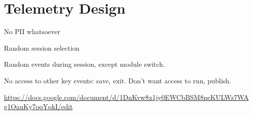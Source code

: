 \documentclass[
  acmsmall,
  review,
  anonymous,
]{acmart}
\begin{document}
\begin{table}
\begin{tabular}{ll}
  \end{tabular}
\end{table}

\section{Telemetry Design}

No PII whatsoever

Random session selection

Random events during session, except module switch.

No access to other key events: save, exit.
Don't want access to run, publish.

\url{https://docs.google.com/document/d/1DnKvw8x1jy0EWCbBSM8neKULWz7WAg1OauKy7qqYqkI/edit}
\end{document}
